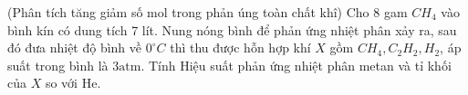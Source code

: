 \begin{vd}
	(Phân tích tăng giảm số mol trong phản úng toàn chất khî)
	Cho 8 gam $CH_4$ vào bình kín có dung tích 7 lít. Nung nóng bình để phản ứng nhiệt phân xảy ra, sau đó đưa nhiệt độ bình về $0^{\circ} C$ thì thu được hỗn hợp khí $X$ gồm $CH_4, C_2 H_2, H_2$, áp suất trong bình là $3\mathrm{atm}$.
	Tính Hiệu suất phản ứng nhiệt phân metan và tỉ khối của $X$ so với He.
	\loigiai{
	}
\end{vd}

